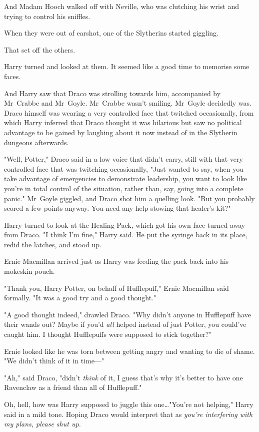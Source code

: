 And Madam Hooch walked off with Neville, who was clutching his wrist and trying
to control his sniffles.

When they were out of earshot, one of the Slytherins started giggling.

That set off the others.

Harry turned and looked at them. It seemed like a good time to memorise some
faces.

And Harry saw that Draco was strolling towards him, accompanied by Mr~Crabbe
and Mr~Goyle. Mr~Crabbe wasn’t smiling. Mr~Goyle decidedly was. Draco
himself was wearing a very controlled face that twitched occasionally, from
which Harry inferred that Draco thought it was hilarious but saw no political
advantage to be gained by laughing about it now instead of in the Slytherin
dungeons afterwards.

"Well, Potter," Draco said in a low voice that didn’t carry, still with that
very controlled face that was twitching occasionally, "Just wanted to say, when
you take advantage of emergencies to demonstrate leadership, you want to look
like you’re in total control of the situation, rather than, say, going into a
complete panic." Mr~Goyle giggled, and Draco shot him a quelling look. "But
you probably scored a few points anyway. You need any help stowing that
healer’s kit?"

Harry turned to look at the Healing Pack, which got his own face turned away
from Draco. "I think I’m fine," Harry said. He put the syringe back in its
place, redid the latches, and stood up.

Ernie Macmillan arrived just as Harry was feeding the pack back into his
mokeskin pouch.

"Thank you, Harry Potter, on behalf of Hufflepuff," Ernie Macmillan said
formally. "It was a good try and a good thought."

"A good thought indeed," drawled Draco. "Why didn’t anyone in Hufflepuff have
their wands out? Maybe if you’d \emph{all} helped instead of just Potter, you
could’ve caught him. I thought Hufflepuffs were supposed to stick together?"

Ernie looked like he was torn between getting angry and wanting to die of
shame. "We didn’t think of it in time—"

"Ah," said Draco, "didn’t \emph{think} of it, I guess that’s why it’s better to
have one Ravenclaw as a friend than all of Hufflepuff."

Oh, hell, how was Harry supposed to juggle this one…"You’re not
helping," Harry said in a mild tone. Hoping Draco would interpret that as
\emph{you’re interfering with my plans, please shut up.}

